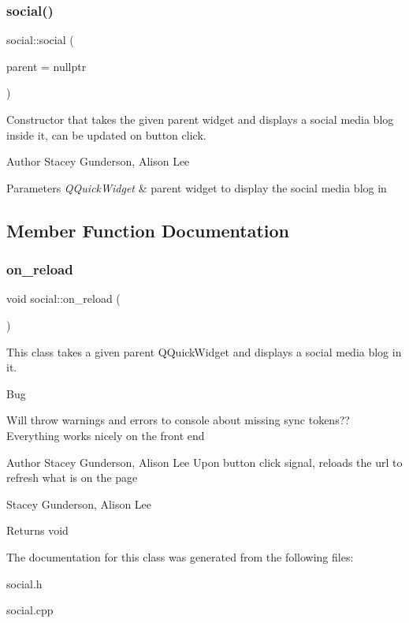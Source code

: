\subsubsection{\texorpdfstring{social()}{social()}}
{\footnotesize\ttfamily social\+::social (\begin{DoxyParamCaption}\item[{Q\+Quick\+Widget $\ast$}]{parent = {\ttfamily nullptr} }\end{DoxyParamCaption})}



Constructor that takes the given parent widget and displays a social media blog inside it, can be updated on button click. 

\begin{DoxyAuthor}{Author}
Stacey Gunderson, Alison Lee 
\end{DoxyAuthor}

\begin{DoxyParams}{Parameters}
{\em Q\+Quick\+Widget} & parent widget to display the social media blog in \\
\hline
\end{DoxyParams}


\subsection{Member Function Documentation}
\mbox{\label{classsocial_aed7a46c6bae233cd68a61aefc8ba3915}} 
\subsubsection{\texorpdfstring{on\+\_\+reload}{on\_reload}}
{\footnotesize\ttfamily void social\+::on\+\_\+reload (\begin{DoxyParamCaption}{ }\end{DoxyParamCaption})\hspace{0.3cm}{\ttfamily [slot]}}



This class takes a given parent Q\+Quick\+Widget and displays a social media blog in it. 

\begin{DoxyRefDesc}{Bug}
\item[\mbox{\hyperlink{bug__bug000002}{Bug}}]Will throw warnings and errors to console about missing sync tokens?? Everything works nicely on the front end \end{DoxyRefDesc}
\begin{DoxyAuthor}{Author}
Stacey Gunderson, Alison Lee Upon button click signal, reloads the url to refresh what is on the page 

Stacey Gunderson, Alison Lee 
\end{DoxyAuthor}
\begin{DoxyReturn}{Returns}
void 
\end{DoxyReturn}


The documentation for this class was generated from the following files\+:\begin{DoxyCompactItemize}
\item 
social.\+h\item 
social.\+cpp\end{DoxyCompactItemize}
